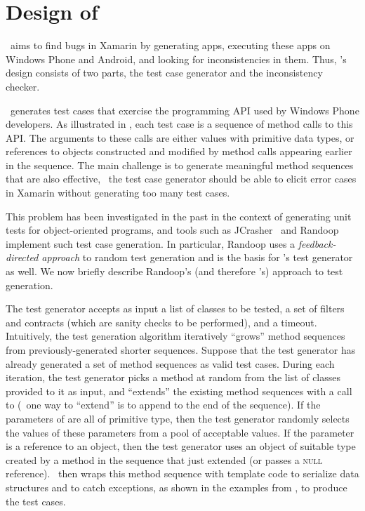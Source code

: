 \section{Design of \TOOL}
\label{section:design}

\tool\ aims to find bugs in Xamarin by generating apps, executing these apps on
Windows Phone and Android, and looking for inconsistencies in them. Thus,
\tool's design consists of two parts, the test case generator and the
inconsistency checker.

%
\tool\ generates test cases that exercise the programming API used by Windows
Phone developers. As illustrated in , each test case is
a sequence of method calls to this API. The arguments to these calls are either
values with primitive data types, or references to objects constructed and
modified by method calls appearing earlier in the sequence. The main challenge
is to generate meaningful method sequences that are also effective, \ie~the
test case generator should be able to elicit error cases in Xamarin without
generating too many test cases.

This problem has been investigated in the past in the context of generating
unit tests for object-oriented programs, and tools such as
JCrasher~\cite{jcrasher}
and Randoop~\cite{randoop:icse07} implement such test case generation. In
particular, Randoop uses a \textit{feedback-directed approach} to random test
generation and is the basis for \tool's test generator as well. We now briefly
describe Randoop's (and therefore \tool's) approach to test generation.

The test generator accepts as input a list of classes to be tested, a set of
filters and contracts (which are sanity checks to be performed), and a timeout.
Intuitively, the test generation algorithm iteratively ``grows'' method
sequences from previously-generated shorter sequences. Suppose that the test
generator has already generated a set of method sequences as valid test cases.
During each iteration, the test generator picks a method  at random from the list of classes provided to it as input,
and ``extends'' the existing method sequences with a call to  (\eg~one
way to ``extend'' is to append  to the end of the sequence). If the
parameters of  are all of primitive type, then the test generator
randomly selects the values of these parameters from a pool of acceptable
values. If the parameter is a reference to an object, then the test generator
uses an object of suitable type created by a method in the sequence that
 just extended (or passes a \textsc{null} reference). \tool\ then wraps
this method sequence with template code to serialize data structures and to
catch exceptions, as shown in the examples from , to
produce the test cases.

